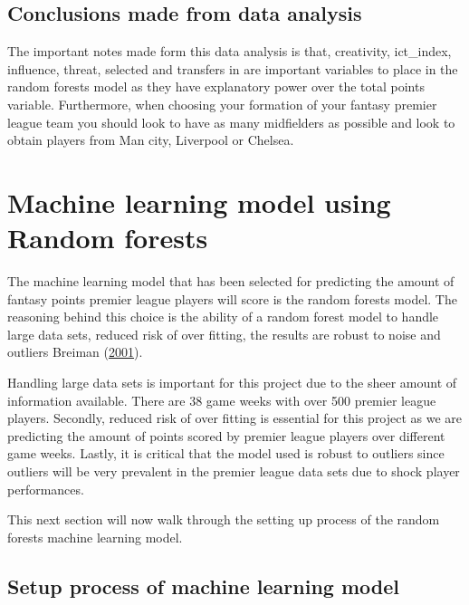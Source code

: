 \documentclass[11pt,preprint, authoryear]{elsarticle}
\numberwithin{equation}{section}
\numberwithin{figure}{section}
\numberwithin{table}{section}
\begin{document}
\hypertarget{conclusions-made-from-data-analysis}{%
\subsection{Conclusions made from data
analysis}\label{conclusions-made-from-data-analysis}}

The important notes made form this data analysis is that, creativity,
ict\_index, influence, threat, selected and transfers in are important
variables to place in the random forests model as they have explanatory
power over the total points variable. Furthermore, when choosing your
formation of your fantasy premier league team you should look to have as
many midfielders as possible and look to obtain players from Man city,
Liverpool or Chelsea.

\hypertarget{machine-learning-model-using-random-forests}{%
\section{Machine learning model using Random
forests}\label{machine-learning-model-using-random-forests}}

The machine learning model that has been selected for predicting the
amount of fantasy points premier league players will score is the random
forests model. The reasoning behind this choice is the ability of a
random forest model to handle large data sets, reduced risk of over
fitting, the results are robust to noise and outliers Breiman
(\protect\hyperlink{ref-breiman2001random}{2001}).

Handling large data sets is important for this project due to the sheer
amount of information available. There are 38 game weeks with over 500
premier league players. Secondly, reduced risk of over fitting is
essential for this project as we are predicting the amount of points
scored by premier league players over different game weeks. Lastly, it
is critical that the model used is robust to outliers since outliers
will be very prevalent in the premier league data sets due to shock
player performances.

This next section will now walk through the setting up process of the
random forests machine learning model.

\hypertarget{setup-process-of-machine-learning-model}{%
\subsection{Setup process of machine learning
model}\label{setup-process-of-machine-learning-model}}
\end{document}
